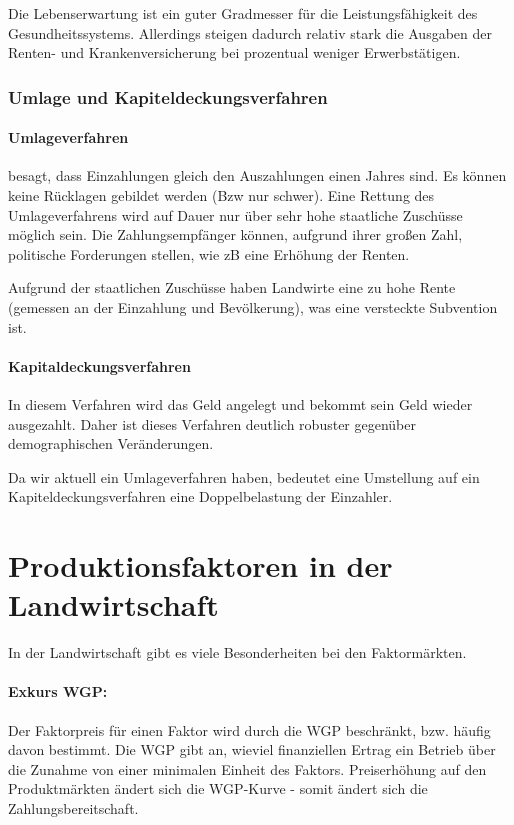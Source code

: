 \documentclass[11pt]{scrartcl}
\begin{document}
Die Lebenserwartung ist ein guter Gradmesser für die Leistungsfähigkeit des Gesundheitssystems.
Allerdings steigen dadurch relativ stark die Ausgaben der Renten- und Krankenversicherung bei prozentual weniger Erwerbstätigen.

\subsubsection{Umlage und Kapiteldeckungsverfahren}

\paragraph{Umlageverfahren} besagt, dass Einzahlungen gleich den Auszahlungen einen Jahres sind.
Es können keine Rücklagen gebildet werden (Bzw nur schwer).
Eine Rettung des Umlageverfahrens wird auf Dauer nur über sehr hohe staatliche Zuschüsse möglich sein.
Die Zahlungsempfänger können, aufgrund ihrer großen Zahl, politische Forderungen stellen, wie zB eine Erhöhung der Renten.

Aufgrund der staatlichen Zuschüsse haben Landwirte eine zu hohe Rente (gemessen an der Einzahlung und Bevölkerung), was eine versteckte Subvention ist.

\paragraph{Kapitaldeckungsverfahren}
In diesem Verfahren wird das Geld angelegt und bekommt sein \glqq Geld\grqq{} wieder ausgezahlt.
Daher ist dieses Verfahren deutlich robuster gegenüber demographischen Veränderungen.

Da wir aktuell ein Umlageverfahren haben, bedeutet eine Umstellung auf ein Kapiteldeckungsverfahren eine Doppelbelastung der Einzahler.

\section{Produktionsfaktoren in der Landwirtschaft}

In der Landwirtschaft gibt es viele Besonderheiten bei den Faktormärkten.

\paragraph{Exkurs \ac{WGP}:}
Der Faktorpreis für einen Faktor wird durch die \ac{WGP} beschränkt, bzw. häufig davon bestimmt.
Die \ac{WGP} gibt an, wieviel finanziellen Ertrag ein Betrieb über die Zunahme von einer minimalen Einheit des Faktors.
Preiserhöhung auf den Produktmärkten ändert sich die \ac{WGP}-Kurve - somit ändert sich die Zahlungsbereitschaft.
\end{document}
